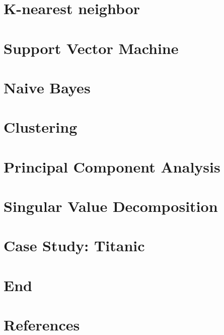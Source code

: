 \section[Knn]{K-nearest neighbor}




\section[SVM]{Support Vector Machine}



\section[NB]{Naive Bayes}




\section[Clust]{Clustering}




\section[PCA]{Principal Component Analysis}



\section[SVD]{Singular Value Decomposition}



\section[Case]{Case Study: Titanic}


\section[End]{End}




\section[Refs]{References}


 